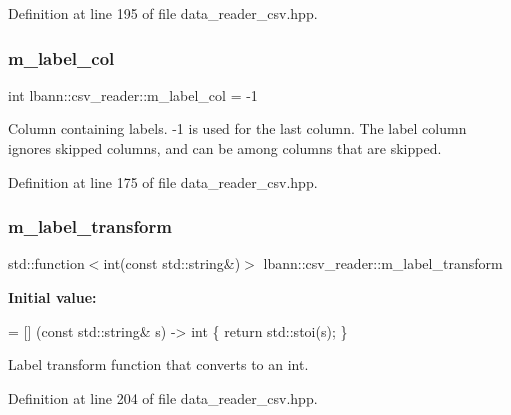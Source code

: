 Definition at line 195 of file data\+\_\+reader\+\_\+csv.\+hpp.

\mbox{\label{classlbann_1_1csv__reader_acc02e56c81421c4507f7178ca8461b04}} 
\subsubsection{\texorpdfstring{m\+\_\+label\+\_\+col}{m\_label\_col}}
{\footnotesize\ttfamily int lbann\+::csv\+\_\+reader\+::m\+\_\+label\+\_\+col = -\/1\hspace{0.3cm}{\ttfamily [protected]}}

Column containing labels. -\/1 is used for the last column. The label column ignores skipped columns, and can be among columns that are skipped. 

Definition at line 175 of file data\+\_\+reader\+\_\+csv.\+hpp.

\mbox{\label{classlbann_1_1csv__reader_aa9b671a172828980cb9c91180c3d0ad8}} 
\subsubsection{\texorpdfstring{m\+\_\+label\+\_\+transform}{m\_label\_transform}}
{\footnotesize\ttfamily std\+::function$<$int(const std\+::string\&)$>$ lbann\+::csv\+\_\+reader\+::m\+\_\+label\+\_\+transform\hspace{0.3cm}{\ttfamily [protected]}}

{\bfseries Initial value\+:}
\begin{DoxyCode}
=
    [] (\textcolor{keyword}{const} std::string& s) -> \textcolor{keywordtype}{int} \{ \textcolor{keywordflow}{return} std::stoi(s); \}
\end{DoxyCode}


Label transform function that converts to an int. 



Definition at line 204 of file data\+\_\+reader\+\_\+csv.\+hpp.

